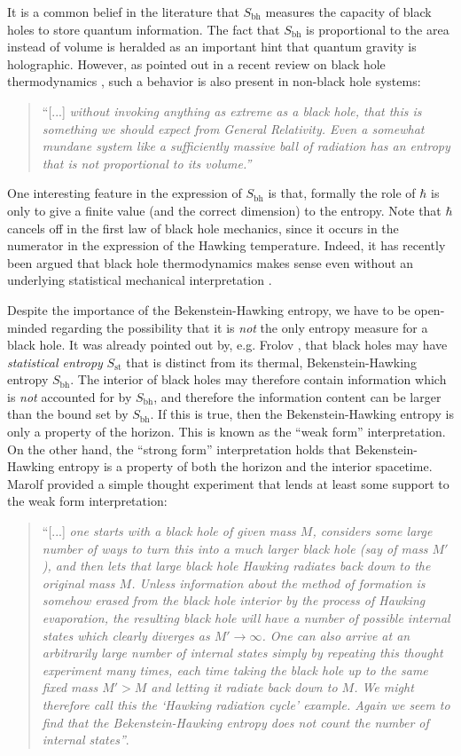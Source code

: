 \documentclass[12pt]{article}
\newcommand{\2}{$^2$}
\newcommand{\3}{$^3$}
\newcommand{\4}{$_4$}
\newcommand{\5}{$_5$}
\begin{document}
It is a common belief in the literature that $S_{\text{bh}}$ measures the capacity of black holes to store quantum information. The fact that $S_{\text{bh}}$ is proportional to the area instead of volume is heralded as an important hint that quantum gravity is holographic. However, as pointed out in a recent review on black hole thermodynamics \cite{1402.5127}, such a behavior is also present in non-black hole systems:
\begin{quote}
``[...] \emph{without invoking anything as extreme as a black hole, that this is
something we should expect from General Relativity. Even a somewhat mundane
system like a sufficiently massive ball of radiation has an entropy that is not proportional
to its volume.''}
\end{quote}
One interesting feature in the expression of $S_{\text{bh}}$ is that, formally the role of $\hbar$ is only to give a finite value (and the correct dimension) to the entropy. Note that $\hbar$ cancels off in the first law of black hole mechanics, since it occurs in the numerator in the expression of the Hawking temperature. Indeed, it has recently been argued that black hole thermodynamics makes sense even without an underlying statistical mechanical interpretation \cite{curiel2}.

Despite the importance of the Bekenstein-Hawking entropy, we have to be open-minded regarding the possibility that it is \emph{not} the only entropy measure for a black hole. It was already pointed out by, e.g. Frolov \cite{facade}, that black holes may have \emph{statistical entropy} $S_{\text{st}}$ that is distinct from its thermal, Bekenstein-Hawking entropy $S_{\text{bh}}$. The interior of black holes may therefore contain information which is \emph{not} accounted for by $S_{\text{bh}}$, and therefore the information content can be larger than the bound set by $S_{\text{bh}}$. If this is true, then the Bekenstein-Hawking entropy is only a property of the horizon. This is known as the ``weak form'' interpretation. On the other hand, the ``strong form'' interpretation holds that Bekenstein-Hawking entropy is a property of both the horizon and the interior spacetime. Marolf \cite{marolf} provided a simple thought experiment that lends at least some support to the weak form interpretation:
\begin{quote}
``[...] \emph{one starts with a black hole of given mass $M$, considers some large
number of ways to turn this into a much larger black hole (say of mass $M'$), and then lets
that large black hole Hawking radiates back down to the original mass $M$. Unless information
about the method of formation is somehow erased from the black hole interior by the process
of Hawking evaporation, the resulting black hole will have a number of possible internal states
which clearly diverges as $M' \to \infty$. One can also arrive at an arbitrarily large number of
internal states simply by repeating this thought experiment many times, each time taking
the black hole up to the same fixed mass $M' > M$ and letting it radiate back down to $M$.
We might therefore call this the ‘Hawking radiation cycle’ example. Again we seem to find
that the Bekenstein-Hawking entropy does not count the number of internal states''}.
\end{quote}
\end{document}

